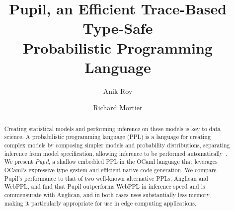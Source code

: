 \documentclass[sigconf]{acmart}
\newcommand{\pupil}{Pupil\xspace}
\begin{document}
\title[
  \pupil, an Efficient Trace-Based Type-Safe Probabilistic Programming Language
]{
  \pupil, an Efficient Trace-Based Type-Safe \\
  Probabilistic Programming Language
}

\author{Anik Roy}

\author{Richard Mortier}


\begin{abstract}
  Creating statistical models and performing inference on these models is key to data science. A probabilistic programming language (PPL) is a language for creating complex models by composing simpler models and probability distributions, separating inference from model specification, allowing inference to be performed automatically~\cite{gordon2014probabilistic}. We present \emph{\pupil}, a shallow embedded PPL in the OCaml language that leverages OCaml's expressive type system and efficient native code generation. We compare \pupil's performance to that of two well-known alternative PPLs, Anglican and WebPPL, and find that \pupil outperforms WebPPL in inference speed and is commensurate with Anglican, and in both cases uses substantially less memory, making it particularly appropriate for use in edge computing applications.
\end{abstract}
\end{document}
